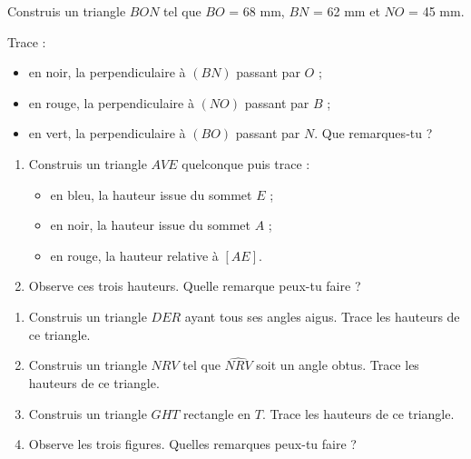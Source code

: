 \begin{exercice}
Construis un triangle $BON$ tel que $BO$ = 68 mm, $BN$ = 62 mm et $NO$ = 45 mm.

Trace :
\begin{itemize}
\item en noir, la perpendiculaire à $(BN)$ passant par $O$ ;
\item en rouge, la perpendiculaire à $(NO)$ passant par $B$ ;
\item en vert, la perpendiculaire à $(BO)$ passant par $N$. Que remarques‑tu ?
\end{itemize}
\end{exercice}


\begin{exercice}
\begin{enumerate}
\item Construis un triangle $AVE$ quelconque puis trace :
    \begin{itemize}
    \item en bleu, la hauteur issue du sommet $E$ ;
    \item en noir, la hauteur issue du sommet $A$ ;
    \item en rouge, la hauteur relative à $[AE]$.
    \end{itemize}
\item Observe ces trois hauteurs. Quelle remarque peux-tu faire ?
\end{enumerate}
\end{exercice}



\begin{exercice}
\begin{enumerate}
\item Construis un triangle $DER$ ayant tous ses angles aigus. Trace les hauteurs de ce triangle.
\item Construis un triangle $NRV$ tel que $\widehat{NRV}$ soit un angle obtus. Trace les hauteurs de ce triangle.
\item Construis un triangle $GHT$ rectangle en $T$. Trace les hauteurs de ce triangle.
\item Observe les trois figures. Quelles remarques peux-tu faire ?
\end{enumerate}
\end{exercice}



